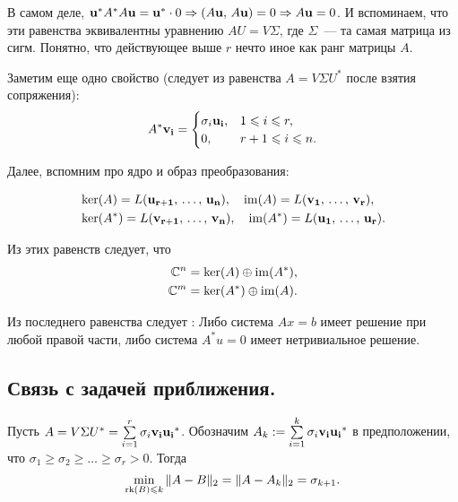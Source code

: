 В самом деле, $\mathbf{u}^*A^*A\mathbf{u}=\mathbf{u}^*\cdot 0\Rightarrow (A\mathbf{u},\,A\mathbf{u})=0\Rightarrow
    A\mathbf{u}=0$. И вспоминаем, что эти равенства эквивалентны уравнению $AU=V\Sigma$, где $\Sigma$~--- та самая матрица из
сигм. Понятно, что действующее выше $r$ нечто иное как ранг матрицы $A$.

Заметим еще одно свойство (следует из равенства $A=V\Sigma U^*$ после взятия сопряжения):
\[
    A^*\mathbf{v_i}=\begin{cases}
        \sigma_i\mathbf{u_i}, & 1\leqslant i\leqslant r,   \\
        0,                  & r+1\leqslant i\leqslant n.
    \end{cases}
\]

Далее, вспомним про ядро и образ преобразования:

\begin{align*}
     & \ker (A)=L(\mathbf{u_{r+1}},\, \ldots,\, \mathbf{u_n}),\quad \operatorname{im}(A)=L(\mathbf{v_1},\,\ldots,\,\mathbf{v_r}),     \\
     & \ker (A^*)=L(\mathbf{v_{r+1}},\, \ldots,\, \mathbf{v_n}),\quad \operatorname{im}(A^*)=L(\mathbf{u_1},\,\ldots,\,\mathbf{u_r}).
\end{align*}

Из этих равенств следует, что
\begin{align*}
    \mathbb{C}^n & =\ker(A)\oplus\operatorname{im}(A^*), \\
    \mathbb{C}^m & =\ker(A^*)\oplus\operatorname{im}(A).
\end{align*}


\begin{remark}
    Из последнего равенства следует :
    Либо система $Ax=b$ имеет решение при любой правой части, либо система $A^*u=0$ имеет нетривиальное решение.    
\end{remark}


\subsection{Связь с задачей приближения.}

\begin{theorem}
    Пусть $A=V\Sigma U^*=\sum\limits_{i=1}^r\sigma_i\mathbf{v_i}\mathbf{u_i}^*$. Обозначим 
    $A_k:=\sum\limits_{i=1}^k\sigma_i\mathbf{v_i}\mathbf{u_i}^*$ в предположении, что 
    $\sigma_1\geqslant \sigma_2\geqslant\ldots\geqslant \sigma_r>0$.
    Тогда \[
        \min_{\operatorname{rk}(B)\leqslant k} \|A-B\|_2=\|A-A_k\|_2=\sigma_{k+1}.
    \]
\end{theorem}

